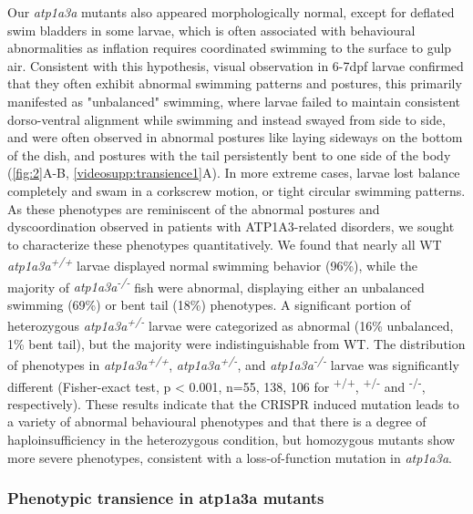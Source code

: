 \documentclass[9.5pt,lineno]{RandlettLab_elife}
\begin{document}
Our \emph{atp1a3a} mutants also appeared morphologically normal, except for deflated swim bladders in some larvae, which is often associated with behavioural abnormalities as inflation requires coordinated swimming to the surface to gulp air. 
Consistent with this hypothesis, visual observation in 6-7dpf larvae confirmed that they often exhibit abnormal swimming patterns and postures, this primarily manifested as "unbalanced" swimming, where larvae failed to maintain consistent dorso-ventral alignment while swimming and instead swayed from side to side, and were often observed in abnormal postures like laying sideways on the bottom of the dish, and postures with the tail persistently bent to one side of the body (\autoref{fig:2}A-B, \autoref{videosupp:transience1}A). In more extreme cases, larvae lost balance completely and swam in a corkscrew motion, or tight circular swimming patterns.
As these phenotypes are reminiscent of the abnormal postures and dyscoordination observed in patients with ATP1A3-related disorders, we sought to characterize these phenotypes quantitatively.  
We found that nearly all WT \emph{atp1a3a\textsuperscript{+/+}} larvae displayed normal swimming behavior (96\%), while the majority of \emph{atp1a3a\textsuperscript{-/-}} fish were abnormal, displaying either an unbalanced swimming (69\%) or bent tail (18\%) phenotypes.
A significant portion of heterozygous \emph{atp1a3a\textsuperscript{+/-}} larvae were categorized as abnormal (16\% unbalanced, 1\% bent tail), but the majority were indistinguishable from WT. 
The distribution of phenotypes in \emph{atp1a3a\textsuperscript{+/+}}, \emph{atp1a3a\textsuperscript{+/-}}, and \emph{atp1a3a\textsuperscript{-/-}} larvae was significantly different (Fisher-exact test, p < 0.001, n=55, 138, 106 for \textsuperscript{+/+}, \textsuperscript{+/-} and \textsuperscript{-/-}, respectively). These results indicate that the CRISPR induced mutation leads to a variety of abnormal behavioural phenotypes and that there is a degree of haploinsufficiency in the heterozygous condition, but homozygous mutants show more severe phenotypes, consistent with a loss-of-function mutation in \emph{atp1a3a}.

\subsubsection{Phenotypic transience in atp1a3a mutants}
\end{document}
